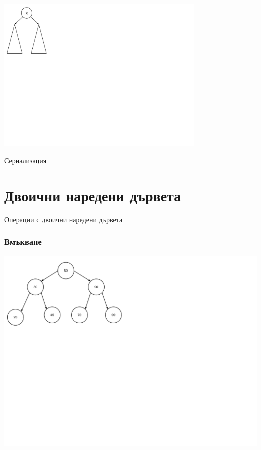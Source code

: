 \documentclass{beamer}
\begin{document}
\begin{frame}
\begin{center}
   \includegraphics[width=10cm]{images/tree_recursive}
\end{center}

\vspace{-200px}
\centerline{Сериализация}


\end{frame}

\section{Двоични наредени дървета}



\begin{frame}
\centerline{Операции с двоични наредени дървета}
\end{frame}


\begin{frame}[fragile]
\frametitle{Вмъкване}

\includegraphics[width=14cm]{images/tree_bot_clean}

\end{frame}
\end{document}
